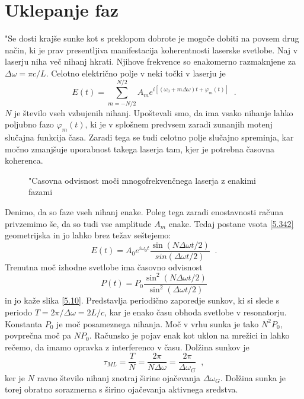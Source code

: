 \section{Uklepanje faz}
\label{chap:Uklepanje}
"Se dosti krajše sunke kot s preklopom dobrote je mogoče dobiti na
povsem drug način, ki je prav presentljiva manifestacija koherentnosti
laserske svetlobe. Naj v laserju niha več nihanj hkrati. Njihove frekvence
so enakomerno razmaknjene za $\Delta \omega =\pi c/L$. Celotno električno
polje v neki točki v laserju je 
\begin{equation}
E(t)=\sum_{m=-N/2}^{N/2}A_{m}e^{i[(\omega _{0}+m\Delta \omega )t+\varphi
_{m}(t)]}\;\;.  \label{5.342}
\end{equation}
$N$ je število vseh vzbujenih nihanj. Upoštevali smo, da ima vsako
nihanje lahko poljubno fazo $\varphi _{m}(t)$, ki je v splošnem predvsem
zaradi zunanjih motenj slučajna funkcija časa. Zaradi tega se tudi
celotno polje slučajno spreminja, kar močno zmanjšuje uporabnost
takega laserja tam, kjer je potrebna časovna koherenca.

\begin{figure}[tbp]
\label{s5.10} \vskip 5cm
\caption{"Casovna odvisnost moči mnogofrekvenčnega laserja z enakimi
fazami }
\end{figure}

Denimo, da so faze vseh nihanj enake. Poleg tega zaradi enostavnosti
računa privzemimo še, da so tudi vse amplitude $A_{m}$ enake. Tedaj
postane vsota \ref{5.342} geometrijska in jo lahko brez težav seštejemo: 
\begin{equation}
E(t)=A_{0}e^{i\omega _{0}t}\frac{\sin (N\Delta \omega t/2)}{sin(\Delta
\omega t/2)}\;\;.  \label{5.352}
\end{equation}
Trenutna moč izhodne svetlobe ima časovno odvisnost 
\begin{equation}
P(t)=P_{0}\frac{\sin ^{2}(N\Delta \omega t/2)}{\sin ^{2}(\Delta \omega t/2)}
\label{5.36}
\end{equation}
in jo kaže slika \ref{5.10}. Predstavlja periodično zaporedje sunkov, ki
si slede s periodo $T=2\pi /\Delta \omega =2L/c$, kar je enako času obhoda
svetlobe v resonatorju. Konstanta $P_{0}$ je moč posameznega nihanja.
Moč v vrhu sunka je tako $N^{2}P_{0}$, povprečna moč pa $NP_{0}$.
Računsko je pojav enak kot uklon na mrežici in lahko rečemo, da imamo
opravka z interferenco v času. Dolžina sunkov je 
\begin{equation}
\tau _{ML}=\frac{T}{N}=\frac{2\pi }{N\Delta \omega }=\frac{2\pi }{\Delta
\omega _{G}}\;\;,  \label{5.37}
\end{equation}
ker je $N$ ravno število nihanj znotraj širine ojačevanja $\Delta
\omega _{G}$. Dolžina sunka je torej obratno sorazmerna s širino
ojačevanja aktivnega sredstva.

